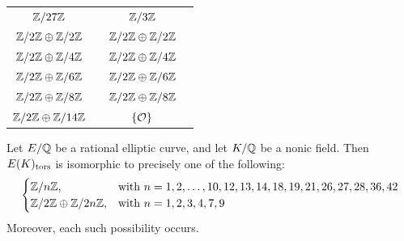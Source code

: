 \begin{frame}[plain]
\begin{table}[!ht]
{\begin{tabular}{cccc}
	$\mathbb{Z}/27\mathbb{Z}$ & \tsaf{} & $\mathbb{Z}/3\mathbb{Z}$ & \qzetatsp{} \\
	$\mathbb{Z}/2\mathbb{Z} \oplus \mathbb{Z}/2\mathbb{Z}$ & \ffat{} & $\mathbb{Z}/2\mathbb{Z} \oplus \mathbb{Z}/2\mathbb{Z}$ & \qzetantp{} \\
	$\mathbb{Z}/2\mathbb{Z} \oplus \mathbb{Z}/4\mathbb{Z}$ & \ffao{} & $\mathbb{Z}/2\mathbb{Z} \oplus \mathbb{Z}/4\mathbb{Z}$ & \qzetantp{} \\
	$\mathbb{Z}/2\mathbb{Z} \oplus \mathbb{Z}/6\mathbb{Z}$ & \tzat{} & $\mathbb{Z}/2\mathbb{Z} \oplus \mathbb{Z}/6\mathbb{Z}$ & \qzetantp{} \\
	$\mathbb{Z}/2\mathbb{Z} \oplus \mathbb{Z}/8\mathbb{Z}$ & \tozet{} & $\mathbb{Z}/2\mathbb{Z} \oplus \mathbb{Z}/8\mathbb{Z}$ & \qzetantp{} \\
	$\mathbb{Z}/2\mathbb{Z} \oplus \mathbb{Z}/14\mathbb{Z}$ & \onttco{} & $\{ \mathcal{O} \}$ & \nnstfttfz{} \\
	\end{tabular}
	}
	\end{table}
\end{frame}



\begin{frame}[plain]
\footnotesize
\begin{conj}
Let $E/\mathbb{Q}$ be a rational elliptic curve, and let $K/\mathbb{Q}$ be a nonic field. Then $E(K)_{\text{tors}}$ is isomorphic to precisely one of the following:
	\[
	\begin{cases}
	\mathbb{Z}/n\mathbb{Z}, & \text{with } n= 1, 2, \ldots, 10, 12, 13, 14, 18, 19, 21, 26, 27, 28, 36, 42 \\
	\mathbb{Z}/2\mathbb{Z} \oplus \mathbb{Z}/2n\mathbb{Z}, & \text{with } n= 1, 2, 3, 4, 7, 9
	\end{cases}
	\]
Moreover, each such possibility occurs.
\end{conj}
\end{frame}



\begin{frame}[plain]
\end{frame}



